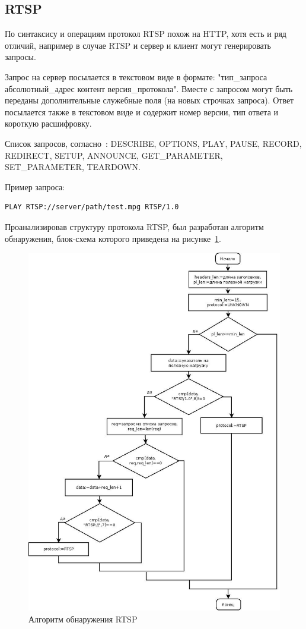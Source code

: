 \subsection{RTSP}
По синтаксису и операциям протокол RTSP похож на HTTP, хотя есть и ряд отличий, например в случае RTSP и сервер и клиент могут генерировать запросы.

Запрос на сервер посылается в текстовом виде в формате: "тип\_запроса абсолютный\_адрес контент версия\_протокола". Вместе с запросом могут быть переданы дополнительные служебные поля (на новых строчках запроса). Ответ посылается также в текстовом виде и содержит номер версии, тип ответа и короткую расшифровку.

Список запросов, согласно~\cite{rtsp_rfc}: DESCRIBE, OPTIONS, PLAY, PAUSE, RECORD, REDIRECT, SETUP, ANNOUNCE, GET\_PARAMETER, SET\_PARAMETER, TEARDOWN.

Пример запроса:
\begin{lstlisting}
PLAY RTSP://server/path/test.mpg RTSP/1.0
\end{lstlisting}

Проанализировав структуру протокола RTSP, был разработан алгоритм обнаружения, блок-схема которого приведена на рисунке~\ref{pic:rtsp_alg}.
\begin{figure}
\centering
\includegraphics[scale=0.45]{pictures/rtsp_alg}
\caption{Алгоритм обнаружения RTSP}
\label{pic:rtsp_alg}
\end{figure}

